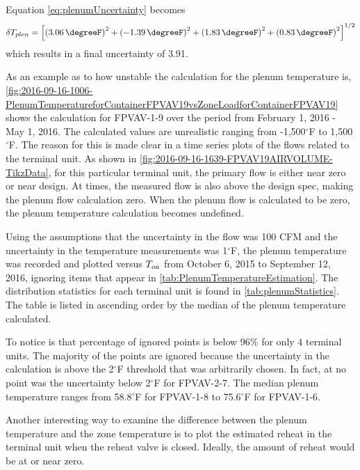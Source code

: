 Equation \ref{eq:plenumUncertainty} becomes
\begin{equation}\label{eq:plenumUncertainty2}
    \delta T_{plen} = \left[\left(  \SI{3.06}{\degreeF}  \right)^2  +\left( \SI{-1.39}{\degreeF}  \right)^2 +  \left( \SI{1.83}{\degreeF} \right)^2 + \left(\SI{0.83}{\degreeF}  \right)^2  \right]^{1/2}
\end{equation}
which results in a final uncertainty of \SI{3.91}{\degreeF}.

As an example as to how unstable the calculation for the plenum
temperature is, \figref{}
\ref{fig:2016-09-16-1006-PlenumTemperatureforContainerFPVAV19vsZoneLoadforContainerFPVAV19}
shows the calculation for FPVAV-1-9 over the period from February 1,
2016 - May 1, 2016. The calculated values are unrealistic ranging from
-1,500\(^\circ\)F to 1,500\(^\circ\)F. The reason for this is made clear
in a time series plots of the flows related to the terminal unit. As
shown in \figref{} \ref{fig:2016-09-16-1639-FPVAV19AIRVOLUME-TikzData},
for this particular terminal unit, the primary flow is either near zero
or near design. At times, the measured flow is also above the design
spec, making the plenum flow calculation zero. When the plenum flow is
calculated to be zero, the plenum temperature calculation becomes
undefined.

Using the assumptions that the uncertainty in the flow was 100 CFM and
the uncertainty in the temperature measurements was 1\(^\circ\)F, the
plenum temperature was recorded and plotted versus \(T_{oa}\) from October
6, 2015 to September 12, 2016, ignoring items that appear in \tableref{}
\ref{tab:PlenumTemperatureEstimation}. The distribution statistics for
each terminal unit is found in \tableref{} \ref{tab:plenumStatistics}.
The table is listed in ascending order by the median of the plenum
temperature calculated.

To notice is that percentage of ignored points is below 96\% for only 4 terminal units.
The majority of the points are ignored because the uncertainty in the calculation is above the 2\(^\circ\)F threshold that was arbitrarily chosen.
In fact, at no point was the uncertainty below 2\(^\circ\)F for FPVAV-2-7.
The median plenum temperature ranges from 58.8\(^\circ\)F for FPVAV-1-8 to 75.6\(^\circ\)F for FPVAV-1-6.

Another interesting way to examine the difference between the plenum
temperature and the zone temperature is to plot the estimated reheat in
the terminal unit when the reheat valve is closed.  Ideally, the amount
of reheat would be at or near zero. 

